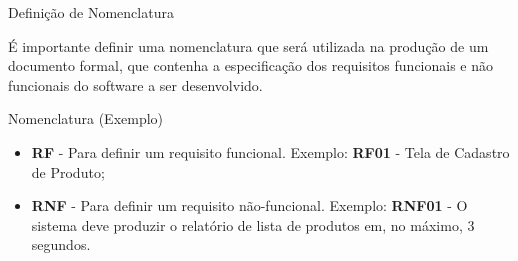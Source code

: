 \documentclass[xcolor=x11names,compress]{beamer}
\begin{document}
\begin{frame}{Definição de Nomenclatura}

É importante definir uma nomenclatura que será utilizada na produção de um documento formal, que contenha a especificação dos requisitos funcionais e não funcionais do software a ser desenvolvido.

\begin{alertblock}{Nomenclatura (Exemplo)}
\begin{itemize}
\itemsep 5mm

\item \textbf{RF} - Para definir um requisito funcional. Exemplo: \textbf{RF01} - Tela de Cadastro de Produto;

\item \textbf{RNF} - Para definir um requisito não-funcional. Exemplo: \textbf{RNF01} - O sistema deve produzir o relatório de lista de produtos em, no máximo, 3 segundos.

\end{itemize}
\end{alertblock}

\end{frame}
\end{document}
